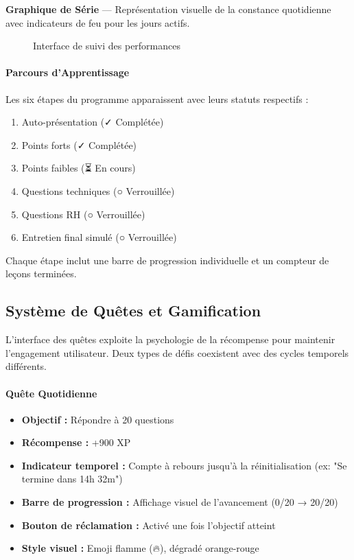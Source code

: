 \documentclass[12pt, a4paper]{report}
\begin{document}
\textbf{Graphique de Série} --- Représentation visuelle de la constance quotidienne avec indicateurs de feu pour les jours actifs.

\begin{figure}[H]
    \centering
    \caption{Interface de suivi des performances}
    \label{fig:progress}
\end{figure}

\paragraph{Parcours d'Apprentissage}
Les six étapes du programme apparaissent avec leurs statuts respectifs :
\begin{enumerate}
    \item Auto-présentation (✓ Complétée)
    \item Points forts (✓ Complétée)
    \item Points faibles (⏳ En cours)
    \item Questions techniques (○ Verrouillée)
    \item Questions RH (○ Verrouillée)
    \item Entretien final simulé (○ Verrouillée)
\end{enumerate}

Chaque étape inclut une barre de progression individuelle et un compteur de leçons terminées.

\subsection{Système de Quêtes et Gamification}

L'interface des quêtes exploite la psychologie de la récompense pour maintenir l'engagement utilisateur. Deux types de défis coexistent avec des cycles temporels différents.

\paragraph{Quête Quotidienne}
\begin{itemize}
    \item \textbf{Objectif :} Répondre à 20 questions
    \item \textbf{Récompense :} +900 XP
    \item \textbf{Indicateur temporel :} Compte à rebours jusqu'à la réinitialisation (ex: "Se termine dans 14h 32m")
    \item \textbf{Barre de progression :} Affichage visuel de l'avancement (0/20 → 20/20)
    \item \textbf{Bouton de réclamation :} Activé une fois l'objectif atteint
    \item \textbf{Style visuel :} Emoji flamme (🔥), dégradé orange-rouge
\end{itemize}
\end{document}

